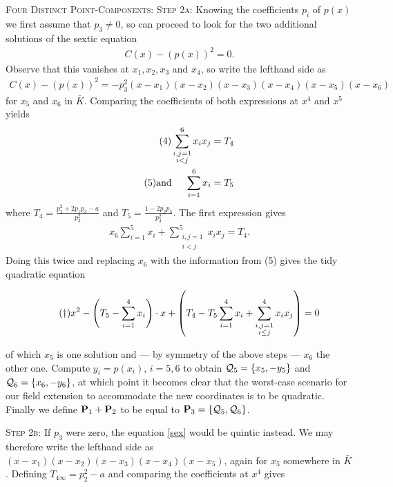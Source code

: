 \documentclass[english,11pt,a4paper]{article}
\begin{document}
\begin{case} {\scshape Four Distinct Point-Components:}
	{\scshape Step 2a:} Knowing the coefficients $p_i$ of $p(x)$ we first assume that $p_3 \neq 0$, so can proceed to look for the two additional solutions of the sextic equation
	\begin{align*}
		\tag{$\ast$} \label{sex} C(x)-\left ( p(x) \right )^2 = 0.
	\end{align*}
	Observe that this vanishes at $x_1, x_2, x_3$ and $x_4$, so write the lefthand side as
	\begin{align*}
		C(x)-\left(p(x)\right)^2 = -p_3^2(x-x_1)(x-x_2)(x-x_3)(x-x_4)(x-x_5)(x-x_6)
	\end{align*}
	 for $x_5$ and $x_6$ in $\bar K$. Comparing the coefficients of both expressions at $x^4$ and $x^5$ yields
	\begin{align*}
		\label{four} \tag{4} \sum_{\substack{i,j=1\\i<j}}^6 x_i x_j &= T_4\\
		\tag{5} \text{and\hspace{5mm}} \sum_{i=1}^6 x_i &= T_5\\
	\end{align*}
	where $T_4 = \frac{p_2^2+2 p_1 p_3-a}{p_3^2}$ and $T_5 = \frac{1-2 p_2 p_3}{p_3^2}$.
	The first expression gives
	\begin{align*}
		x_6 \sum_{i=1}^5 x_i + \sum_{\substack{i,j=1\\i<j}}^5 x_i x_j = T_4.
	\end{align*}
	Doing this twice and replacing $x_6$ with the information from (5) gives the tidy quadratic equation

	\vspace{-3mm}
	\fline
	\begin{align*}
		\tag{$\dag$} \label{dagger} x^2 - \left(T_5 - \sumfo \right) \cdot x+ \left(T_4 - T_5 \sumfo + \sum_{\substack{i,j=1\\i\leq j}}^4 x_i x_j \right) = 0
	\end{align*}
	\fline

	of which $x_5$ is one solution and --- by symmetry of the above steps --- $x_6$ the other one. Compute $y_i=p(x_i)$, $i=5,6$ to obtain $\q_5 = \{ x_5, -y_5 \}$ and $\q_6 = \{ x_6, -y_6 \}$, at which point it becomes clear that the worst-case scenario for our field extension to accommodate the new coordinates is to be quadratic. Finally we define $\P_1 + \P_2$ to be equal to $\P_3 = \{ \q_5, \q_6 \}$.

	{\scshape Step 2b:} If $p_3$ were zero, the equation \eqref{sex} would be quintic instead. We may therefore write the lefthand side as $(x-x_1)(x-x_2)(x-x_3)(x-x_4)(x-x_5)$, again for $x_5$ somewhere in $\bar K$. Defining $T_{4\infty}=p_2^2 - a$ and comparing the coefficients at $x^4$ gives


\end{case}
\end{document}
